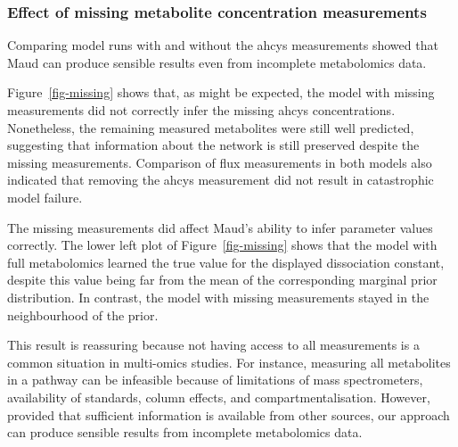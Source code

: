 \documentclass[journal=asbcd6,manuscript=article,layout=traditional]{achemso}
\begin{document}
\hypertarget{effect-of-missing-metabolite-concentration-measurements}{%
\subsubsection{Effect of missing metabolite concentration
measurements}\label{effect-of-missing-metabolite-concentration-measurements}}

Comparing model runs with and without the ahcys measurements showed that
Maud can produce sensible results even from incomplete metabolomics
data.

Figure~\ref{fig-missing} shows that, as might be expected, the model
with missing measurements did not correctly infer the missing ahcys
concentrations. Nonetheless, the remaining measured metabolites were
still well predicted, suggesting that information about the network is
still preserved despite the missing measurements. Comparison of flux
measurements in both models also indicated that removing the ahcys
measurement did not result in catastrophic model failure.

The missing measurements did affect Maud's ability to infer parameter
values correctly. The lower left plot of Figure~\ref{fig-missing} shows
that the model with full metabolomics learned the true value for the
displayed dissociation constant, despite this value being far from the
mean of the corresponding marginal prior distribution. In contrast, the
model with missing measurements stayed in the neighbourhood of the
prior.

This result is reassuring because not having access to all measurements
is a common situation in multi-omics studies. For instance, measuring
all metabolites in a pathway can be infeasible because of limitations of
mass spectrometers, availability of standards, column effects, and
compartmentalisation. However, provided that sufficient information is
available from other sources, our approach can produce sensible results
from incomplete metabolomics data.
\end{document}
